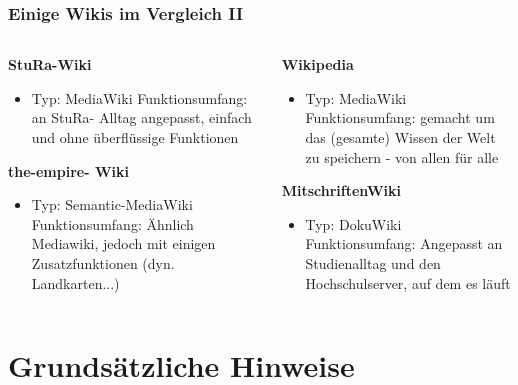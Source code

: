 \documentclass{beamer}              %
\begin{document}
\begin{frame}
  \frametitle{Einige Wikis im Vergleich II}
  \begin{columns}
    \begin{column}{0.5\linewidth}

      \textbf{StuRa-Wiki}
      \begin{itemize}
        \item Typ: MediaWiki Funktionsumfang: an StuRa- Alltag angepasst, einfach und ohne überflüssige Funktionen
      \end{itemize}

      \textbf{the-empire- Wiki}
      \begin{itemize}
        \item Typ: Semantic-MediaWiki Funktionsumfang: Ähnlich Mediawiki, jedoch mit einigen Zusatzfunktionen (dyn. Landkarten...)
      \end{itemize}
    \end{column}
    \begin{column}{0.5\linewidth}
    
      \textbf{Wikipedia}
      \begin{itemize}
        \item Typ: MediaWiki Funktionsumfang: gemacht um das (gesamte) Wissen der Welt zu speichern - von allen für alle
      \end{itemize}

      \textbf{MitschriftenWiki}
      \begin{itemize}
        \item Typ: DokuWiki Funktionsumfang: Angepasst an Studienalltag und den Hochschulserver, auf dem es läuft
      \end{itemize}
    \end{column}
  \end{columns}
\end{frame}

\section{Grundsätzliche Hinweise}
\end{document}
